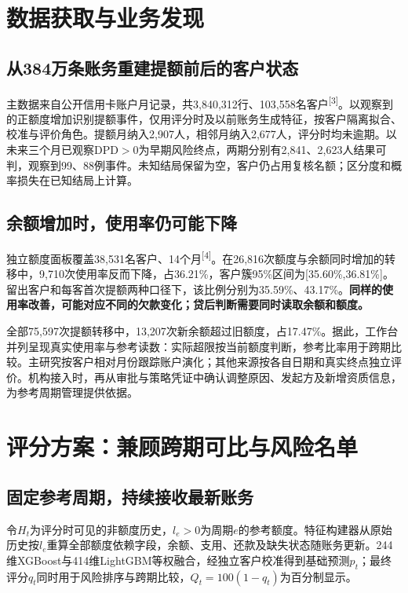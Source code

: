 \clearpage
\section{数据获取与业务发现}
\subsection{从384万条账务重建提额前后的客户状态}
主数据来自公开信用卡账户月记录，共3,840,312行、103,558名客户\textsuperscript{[3]}。以观察到的正额度增加识别提额事件，仅用评分时及以前账务生成特征，按客户隔离拟合、校准与评价角色。提额月纳入2,907人，相邻月纳入2,677人，评分时均未逾期。以未来三个月已观察DPD$>0$为早期风险终点，两期分别有2,841、2,623人结果可判，观察到99、88例事件。未知结局保留为空，客户仍占用复核名额；区分度和概率损失在已知结局上计算。



\subsection{余额增加时，使用率仍可能下降}
独立额度面板覆盖38,531名客户、14个月\textsuperscript{[4]}。在26,816次额度与余额同时增加的转移中，9,710次使用率反而下降，占36.21\%，客户簇95\%区间为[35.60\%,36.81\%]。留出客户和每客首次提额两种口径下，该比例分别为35.59\%、43.17\%。\textbf{同样的使用率改善，可能对应不同的欠款变化；贷后判断需要同时读取余额和额度。}


全部75,597次提额转移中，13,207次新余额超过旧额度，占17.47\%。据此，工作台并列呈现真实使用率与参考读数：实际超限按当前额度判断，参考比率用于跨期比较。主研究按客户相对月份跟踪账户演化；其他来源按各自日期和真实终点独立评价。机构接入时，再从审批与策略凭证中确认调整原因、发起方及新增资质信息，为参考周期管理提供依据。

\clearpage
\section{评分方案：兼顾跨期可比与风险名单}
\subsection{固定参考周期，持续接收最新账务}
令$H_t$为评分时可见的非额度历史，$l_e>0$为周期$e$的参考额度。特征构建器从原始历史按$l_e$重算全部额度依赖字段，余额、支用、还款及缺失状态随账务更新。244维XGBoost与414维LightGBM等权融合，经独立客户校准得到基础预测$p_t$；最终评分$q_t$同时用于风险排序与跨期比较，$Q_t=100(1-q_t)$为百分制显示。

